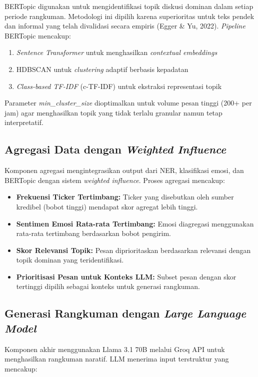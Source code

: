 BERTopic digunakan untuk mengidentifikasi topik diskusi dominan dalam setiap periode rangkuman. Metodologi ini dipilih karena superioritas untuk teks pendek dan informal yang telah divalidasi secara empiris (Egger \& Yu, 2022). \textit{Pipeline} BERTopic mencakup:

\begin{enumerate}
\item \textit{Sentence Transformer} untuk menghasilkan \textit{contextual embeddings}
\item HDBSCAN untuk \textit{clustering} adaptif berbasis kepadatan
\item \textit{Class-based TF-IDF} (c-TF-IDF) untuk ekstraksi representasi topik
\end{enumerate}

Parameter \textit{min\_cluster\_size} dioptimalkan untuk volume pesan tinggi (200+ per jam) agar menghasilkan topik yang tidak terlalu granular namun tetap interpretatif.

\subsection{Agregasi Data dengan \textit{Weighted Influence}}

Komponen agregasi mengintegrasikan output dari NER, klasifikasi emosi, dan BERTopic dengan sistem \textit{weighted influence}. Proses agregasi mencakup:

\begin{itemize}
\item \textbf{Frekuensi Ticker Tertimbang:} Ticker yang disebutkan oleh sumber kredibel (bobot tinggi) mendapat skor agregat lebih tinggi.
\item \textbf{Sentimen Emosi Rata-rata Tertimbang:} Emosi diagregasi menggunakan rata-rata tertimbang berdasarkan bobot pengirim.
\item \textbf{Skor Relevansi Topik:} Pesan diprioritaskan berdasarkan relevansi dengan topik dominan yang teridentifikasi.
\item \textbf{Prioritisasi Pesan untuk Konteks LLM:} Subset pesan dengan skor tertinggi dipilih sebagai konteks untuk generasi rangkuman.
\end{itemize}

\subsection{Generasi Rangkuman dengan \textit{Large Language Model}}

Komponen akhir menggunakan Llama 3.1 70B melalui Groq API untuk menghasilkan rangkuman naratif. LLM menerima input terstruktur yang mencakup:

